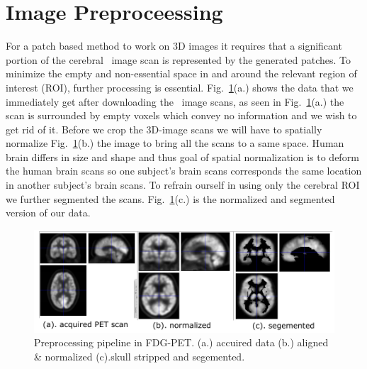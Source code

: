\section{Image Preproceessing}
\label{sec:image_preprocessing}
For a patch based method to work on 3D images it requires that a significant portion of the cerebral \FDGPET ~image scan is represented by the generated patches. To minimize the empty and non-essential space in and around the relevant region of interest (ROI), further processing is essential. Fig.~\ref{fig:preprocessing}(a.) shows the data that we immediately get after downloading the \FDGPET ~image scans, as seen in Fig.~\ref{fig:preprocessing}(a.) the scan is surrounded by empty voxels which convey no information and we wish to get rid of it. Before we crop the 3D-image scans we will have to spatially normalize Fig.~\ref{fig:preprocessing}(b.) the image to bring all the scans to a same space. Human brain differs in size and shape and thus goal of spatial normalization is to deform the human brain scans so one subject's brain scans corresponds the same location in another subject's brain scans. To refrain ourself in using only the cerebral ROI we further segmented the scans. Fig.~\ref{fig:preprocessing}(c.) is the normalized and segmented version of our data. 
\begin{figure}[h]
	\centering
	\includegraphics[width=\linewidth]{figures/preprocessing}
	\caption[Prepocessing pipeline.]{Preprocessing pipeline in FDG-PET. (a.) accuired data (b.) aligned \& normalized (c).skull stripped and segemented.}
	\label{fig:preprocessing}
\end{figure}
    
